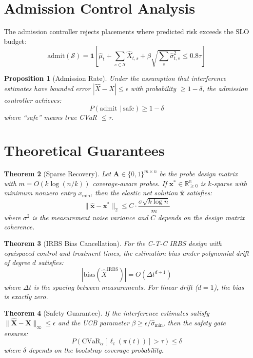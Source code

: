 \documentclass[11pt,twocolumn]{article}
\newtheorem{theorem}{Theorem}
\newtheorem{proposition}[theorem]{Proposition}
\begin{document}
\section{Admission Control Analysis}

The admission controller rejects placements where predicted risk exceeds
the SLO budget:
\begin{equation}
\text{admit}(\mathcal{S}) = \mathbf{1}\left[\hat{\mu}_t + \sum_{s \in \mathcal{S}} \hat{X}_{t,s} + \beta \sqrt{\sum_{s} \hat{\sigma}_{t,s}^2} \leq 0.8\tau\right]
\end{equation}

\begin{proposition}[Admission Rate]
Under the assumption that interference estimates have bounded error
$|\hat{X} - X| \leq \epsilon$ with probability $\geq 1-\delta$,
the admission controller achieves:
\[
P(\text{admit} \mid \text{safe}) \geq 1 - \delta
\]
where ``safe'' means true CVaR $\leq \tau$.
\end{proposition}

\section{Theoretical Guarantees}

\begin{theorem}[Sparse Recovery]
Let $\mathbf{A} \in \{0,1\}^{m \times n}$ be the probe design matrix
with $m = O(k \log(n/k))$ coverage-aware probes. If $\mathbf{x}^* \in
\mathbb{R}_{\geq 0}^n$ is $k$-sparse with minimum nonzero entry
$x_{\min}$, then the elastic net solution $\hat{\mathbf{x}}$ satisfies:
\[
\|\hat{\mathbf{x}} - \mathbf{x}^*\|_2 \leq C \cdot \frac{\sigma \sqrt{k \log n}}{m}
\]
where $\sigma^2$ is the measurement noise variance and $C$ depends on
the design matrix coherence.
\end{theorem}

\begin{theorem}[IRBS Bias Cancellation]
For the C-T-C IRBS design with equispaced control and treatment times,
the estimation bias under polynomial drift of degree $d$ satisfies:
\[
|\text{bias}(\hat{X}^{\text{IRBS}})| = O(\Delta t^{d+1})
\]
where $\Delta t$ is the spacing between measurements. For linear drift
($d=1$), the bias is exactly zero.
\end{theorem}

\begin{theorem}[Safety Guarantee]
If the interference estimates satisfy $\|\hat{\mathbf{X}} - \mathbf{X}\|_\infty
\leq \epsilon$ and the UCB parameter $\beta \geq \epsilon / \hat{\sigma}_{\min}$,
then the safety gate ensures:
\[
P(\text{CVaR}_\alpha[\ell_t(\pi(t))] > \tau) \leq \delta
\]
where $\delta$ depends on the bootstrap coverage probability.
\end{theorem}
\end{document}

